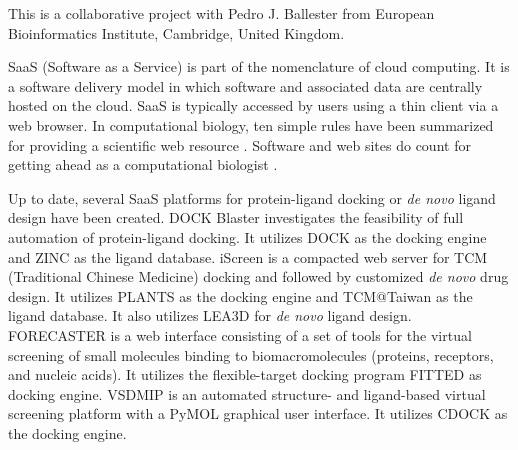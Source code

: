 This is a collaborative project with Pedro J. Ballester from European Bioinformatics Institute, Cambridge, United Kingdom.

SaaS (Software as a Service) is part of the nomenclature of cloud computing. It is a software delivery model in which software and associated data are centrally hosted on the cloud. SaaS is typically accessed by users using a thin client via a web browser. In computational biology, ten simple rules have been summarized for providing a scientific web resource \citep{677}. Software and web sites do count for getting ahead as a computational biologist \citep{260}.

Up to date, several SaaS platforms for protein-ligand docking or \textit{de novo} ligand design have been created. DOCK Blaster \citep{557} investigates the feasibility of full automation of protein-ligand docking. It utilizes DOCK \citep{1222} as the docking engine and ZINC \citep{532,1178} as the ligand database. iScreen \citep{899} is a compacted web server for TCM (Traditional Chinese Medicine) docking and followed by customized \textit{de novo} drug design. It utilizes PLANTS \citep{610,607,779} as the docking engine and TCM@Taiwan \citep{528} as the ligand database. It also utilizes LEA3D \citep{1223} for \textit{de novo} ligand design. FORECASTER \citep{1012} is a web interface consisting of a set of tools for the virtual screening of small molecules binding to biomacromolecules (proteins, receptors, and nucleic acids). It utilizes the flexible-target docking program FITTED \citep{602} as docking engine. VSDMIP \citep{848} is an automated structure- and ligand-based virtual screening platform with a PyMOL graphical user interface. It utilizes CDOCK \citep{1224} as the docking engine.

